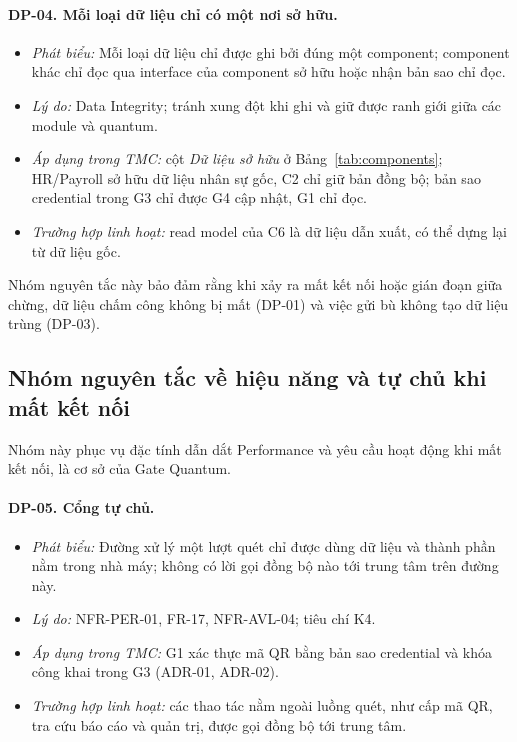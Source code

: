 \paragraph{DP-04. Mỗi loại dữ liệu chỉ có một nơi sở hữu.}\label{dp:04}
\begin{itemize}
    \item \textit{Phát biểu:} Mỗi loại dữ liệu chỉ được ghi bởi đúng một component; component khác chỉ đọc qua interface của component sở hữu hoặc nhận bản sao chỉ đọc.
    \item \textit{Lý do:} Data Integrity; tránh xung đột khi ghi và giữ được ranh giới giữa các module và quantum.
    \item \textit{Áp dụng trong TMC:} cột \textit{Dữ liệu sở hữu} ở Bảng~\ref{tab:components}; HR/Payroll sở hữu dữ liệu nhân sự gốc, C2 chỉ giữ bản đồng bộ; bản sao credential trong G3 chỉ được G4 cập nhật, G1 chỉ đọc.
    \item \textit{Trường hợp linh hoạt:} read model của C6 là dữ liệu dẫn xuất, có thể dựng lại từ dữ liệu gốc.
\end{itemize}

Nhóm nguyên tắc này bảo đảm rằng khi xảy ra mất kết nối hoặc gián đoạn giữa chừng, dữ liệu chấm công không bị mất (DP-01) và việc gửi bù không tạo dữ liệu trùng (DP-03).

\subsection{Nhóm nguyên tắc về hiệu năng và tự chủ khi mất kết nối}\label{sec:dp-autonomy}
Nhóm này phục vụ đặc tính dẫn dắt Performance và yêu cầu hoạt động khi mất kết nối, là cơ sở của Gate Quantum.

\paragraph{DP-05. Cổng tự chủ.}\label{dp:05}
\begin{itemize}
    \item \textit{Phát biểu:} Đường xử lý một lượt quét chỉ được dùng dữ liệu và thành phần nằm trong nhà máy; không có lời gọi đồng bộ nào tới trung tâm trên đường này.
    \item \textit{Lý do:} NFR-PER-01, FR-17, NFR-AVL-04; tiêu chí K4.
    \item \textit{Áp dụng trong TMC:} G1 xác thực mã QR bằng bản sao credential và khóa công khai trong G3 (ADR-01, ADR-02).
    \item \textit{Trường hợp linh hoạt:} các thao tác nằm ngoài luồng quét, như cấp mã QR, tra cứu báo cáo và quản trị, được gọi đồng bộ tới trung tâm.
\end{itemize}

